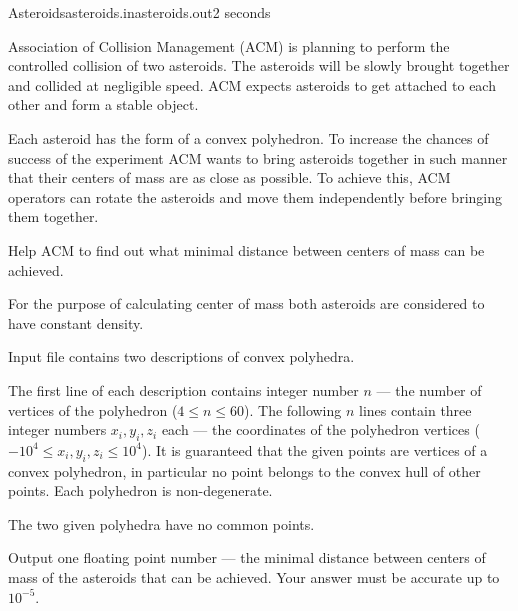 \begin{problem}{Asteroids}{asteroids.in}{asteroids.out}{2 seconds}


Association of Collision Management (ACM) is planning to perform the controlled
collision of two asteroids.
The asteroids will be slowly brought together and collided at negligible speed.
ACM expects asteroids to get attached to each other and form a stable object.

Each asteroid has the form of a convex polyhedron. To increase the chances of success
of the experiment ACM wants to bring asteroids together in such manner that
their centers of mass are as close as possible. To achieve this,
ACM operators can rotate the asteroids and move them independently before
bringing them together.

Help ACM to find out
what minimal distance between centers of mass can be achieved.

For the purpose of calculating center of mass both asteroids are considered to
have constant density.

\InputFile

Input file contains two descriptions of convex polyhedra.

The first line of each description
contains integer number $n$ --- the number of vertices of
the polyhedron ($4 \le n \le 60$).
The following $n$ lines contain three integer numbers $x_i, y_i, z_i$ each ---
the coordinates of the polyhedron vertices ($-10^4 \le x_i, y_i, z_i \le 10^4$).
It is guaranteed that the given points are vertices of a convex polyhedron,
in particular no point belongs to the convex hull of other points. Each
polyhedron is non-degenerate.

The two given polyhedra have no common points.

\OutputFile

Output one floating point number --- the minimal distance between centers of mass
of the asteroids that can be achieved. Your answer must be accurate up to $10^{-5}$.

\Example

\begin{example}
%
\end{example}

\end{problem}
